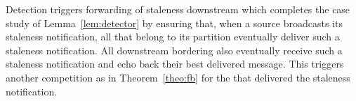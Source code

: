 

Detection triggers forwarding of staleness downstream which
completes the case study of Lemma~\ref{lem:detector} by ensuring
that, when a source broadcasts its staleness notification, all
\processes that belong to its partition eventually deliver such a
staleness notification. All downstream bordering \processes also
eventually receive such a staleness notification and echo back their
best delivered message. This triggers another competition as in
Theorem~\ref{theo:fb} for the \processes that delivered the
staleness notification.

